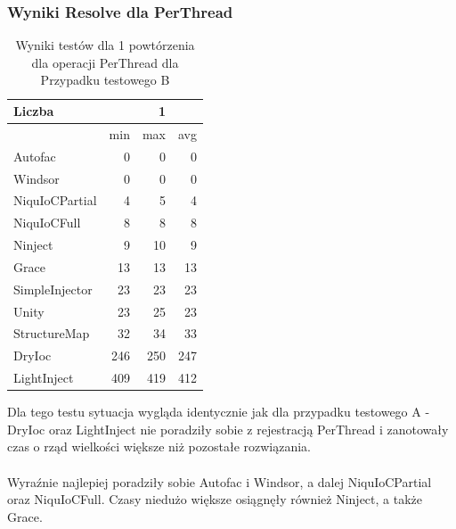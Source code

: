 \documentclass[12pt]{article}
\begin{document}
\subsubsection{Wyniki Resolve dla PerThread}
\begin{table}[H]
\captionsetup{belowskip=0pt,aboveskip=0pt}
\begin{center}
\begin{small}
	\begin{tabular}{ | l | r r r | }
    		\hline
Liczba & & 1 & \\ \hline
 & min & max & avg \\ \hline
Autofac & 0 & 0 & 0 \\ \hline
Windsor & 0 & 0 & 0 \\ \hline
NiquIoCPartial & 4 & 5 & 4 \\ \hline
NiquIoCFull & 8 & 8 & 8 \\ \hline
Ninject & 9 & 10 & 9 \\ \hline
Grace & 13 & 13 & 13 \\ \hline
SimpleInjector & 23 & 23 & 23 \\ \hline
Unity & 23 & 25 & 23 \\ \hline
StructureMap & 32 & 34 & 33 \\ \hline
DryIoc & 246 & 250 & 247 \\ \hline
LightInject & 409 & 419 & 412 \\ \hline
  	\end{tabular}
\end{small}
\end{center}
\caption{Wyniki testów dla 1 powtórzenia dla operacji PerThread dla Przypadku testowego B}
\label{TestCaseB_PerThread1}
\end{table}
Dla tego testu sytuacja wygląda identycznie jak dla przypadku testowego A - DryIoc oraz LightInject nie poradziły sobie z rejestracją PerThread i zanotowały czas o rząd wielkości większe niż pozostałe rozwiązania.\\
\\
Wyraźnie najlepiej poradziły sobie Autofac i Windsor, a dalej NiquIoCPartial oraz NiquIoCFull. Czasy niedużo większe osiągnęły również Ninject, a także Grace.
\\ \\
\end{document}
